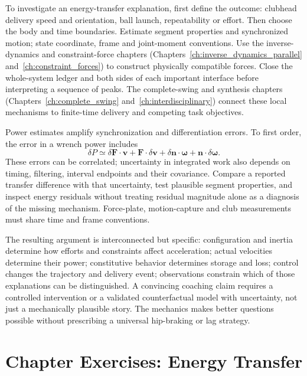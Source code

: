 To investigate an energy-transfer explanation, first define the outcome:
clubhead delivery speed and orientation, ball launch, repeatability or effort.
Then choose the body and time boundaries. Estimate segment properties and
synchronized motion; state coordinate, frame and joint-moment conventions.
Use the inverse-dynamics and constraint-force chapters (Chapters~\ref{ch:inverse_dynamics_parallel} and~\ref{ch:constraint_forces}) to construct physically
compatible forces. Close the whole-system ledger and both sides of each
important interface before interpreting a sequence of peaks. The complete-swing
and synthesis chapters (Chapters~\ref{ch:complete_swing} and~\ref{ch:interdisciplinary}) connect these local mechanisms to finite-time delivery
and competing task objectives.

Power estimates amplify synchronization and differentiation errors. To first
order, the error in a wrench power includes
\begin{equation}
\delta P\simeq\delta\mathbf F\cdot\mathbf v
 +\mathbf F\cdot\delta\mathbf v
 +\delta\mathbf n\cdot\boldsymbol\omega
 +\mathbf n\cdot\delta\boldsymbol\omega.
\label{eq:energy_power_uncertainty}
\end{equation}
These errors can be correlated; uncertainty in integrated work also depends
on timing, filtering, interval endpoints and their covariance. Compare a
reported transfer difference with that uncertainty, test plausible segment
properties, and inspect energy residuals without treating residual magnitude
alone as a diagnosis of the missing mechanism. Force-plate, motion-capture and
club measurements must share time and frame conventions.

The resulting argument is interconnected but specific: configuration and
inertia determine how efforts and constraints affect acceleration; actual
velocities determine their power; constitutive behavior determines storage and
loss; control changes the trajectory and delivery event; observations constrain
which of those explanations can be distinguished. A convincing coaching claim
requires a controlled intervention or a validated counterfactual model with
uncertainty, not just a mechanically plausible story. The mechanics makes better
questions possible without prescribing a universal hip-braking or lag strategy.

\section{Chapter Exercises: Energy Transfer}


